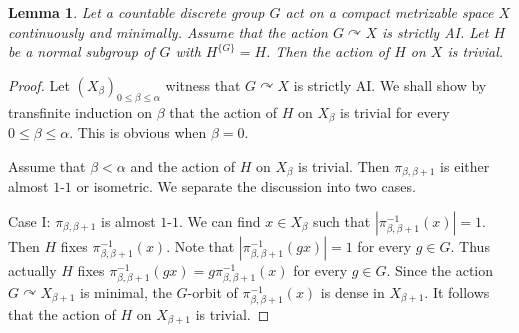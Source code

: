 \documentclass[11pt]{amsart}
\newtheorem{lemma}[theorem]{Lemma}
\theoremstyle{definition}
\numberwithin{equation}{section}
\theoremstyle{definition}
\begin{document}
\begin{lemma} \label{L-trivial action}
Let a countable discrete group $G$ act on  a compact metrizable space $X$ continuously and minimally. Assume that the action $G\curvearrowright X$ is strictly AI. Let $H$ be a normal subgroup of $G$ with $H^{\{G\}}=H$. Then the action of $H$ on $X$ is trivial. 
\end{lemma}
\begin{proof} Let $(X_\beta)_{0\le \beta\le \alpha}$ witness that $G\curvearrowright X$ is strictly AI. We shall show by transfinite induction on $\beta$ that the action of $H$ on $X_\beta$ is trivial for every $0\le \beta\le \alpha$. This is obvious when $\beta=0$. 

Assume that $\beta<\alpha$ and the action of $H$ on $X_\beta$ is trivial. Then $\pi_{\beta, \beta+1}$ is either almost $1$-$1$ or isometric. We separate the discussion into two cases. 

Case I: $\pi_{\beta, \beta+1}$ is almost $1$-$1$. We can find $x\in X_{\beta}$ such that $|\pi_{\beta, \beta+1}^{-1}(x)|=1$. Then $H$ fixes $\pi_{\beta, \beta+1}^{-1}(x)$. Note that $|\pi_{\beta, \beta+1}^{-1}(gx)|=1$ for every $g\in G$. Thus actually $H$ fixes  $\pi_{\beta, \beta+1}^{-1}(gx)=g\pi_{\beta, \beta+1}^{-1}(x)$ for every $g\in G$. Since the action $G\curvearrowright X_{\beta+1}$ is minimal, the $G$-orbit of $\pi_{\beta, \beta+1}^{-1}(x)$ is dense in $X_{\beta+1}$. It follows that the action of $H$ on $X_{\beta+1}$ is trivial.


\end{proof}
\end{document}
